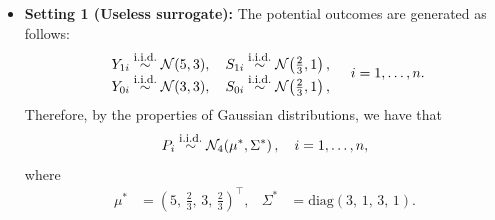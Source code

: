 \documentclass[referee,usenatbib]{biom}
\newcommand{\iid}{\overset{\text{\footnotesize i.i.d.}}{\sim}}
\begin{document}
\begin{itemize}[leftmargin=*]
    \item \textbf{Setting 1 (Useless surrogate):} The potential outcomes are generated as follows:
    \begin{equation*}
    \begin{array}{l}
        Y_{1i} \iid \mathcal{N}(5, 3), \quad S_{1i} \iid \mathcal{N}\!\left(\tfrac{2}{3}, 1\right), \\
        Y_{0i} \iid \mathcal{N}(3, 3), \quad S_{0i} \iid \mathcal{N}\!\left(\tfrac{2}{3}, 1\right),
    \end{array}
    \quad i = 1, \ldots, n.
    \end{equation*}
    Therefore, by the properties of Gaussian distributions, we have that
    \begin{equation*}
        P_{i} \iid \mathcal{N}_4\!\left(\mu^*, \Sigma^*\right), \quad i = 1, \ldots, n,
    \end{equation*}
    where
    \begin{align*}
        \mu^* &= \left(5,\, \tfrac{2}{3},\, 3,\, \tfrac{2}{3}\right)^\top, &
        \Sigma^* &= \mathrm{diag}\!\left(3,\, 1,\, 3,\, 1\right).
    \end{align*}


\end{itemize}
\end{document}

